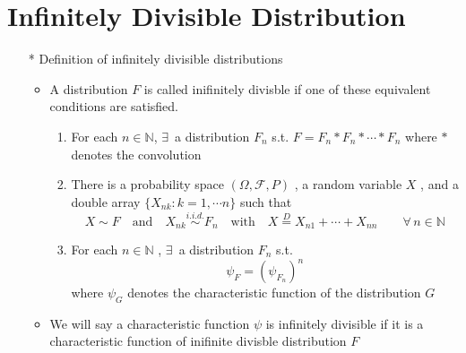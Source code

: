 \documentclass[12pt, A4]{article}
\newcommand{\N}{\mathbb{N}}
\newcommand{\F}{\mathcal{F}}
\newcommand{\exist}{\exists\,}
\newcommand{\foranyn}{\quad \forall \, n\in \N}
\begin{document}
\section{Infinitely Divisible Distribution}
\begin{itemize}
	\item[*] Definition of infinitely divisible distributions
	\begin{itemize}
		\item A distribution $F$ is called inifinitely divisble if one of these equivalent conditions are satisfied.
		\begin{enumerate}
			\item For each $n\in \N$, $\exist$ a distribution $F_n$ s.t. $F= F_n * F_n * \cdots * F_n$ where $*$ denotes the convolution
			\item There is a probability space $(\Omega, \F, P)$ , a random variable $X$ , and a double array $\{X_{nk} : k=1, \cdots n\}$ such that $$ X\sim F \quad \text{and} \quad X_{nk}\overset{i.i.d.}{\sim} F_n \quad \text{with} \quad X\overset{D}{=}X_{n1}+\cdots+X_{nn}\quad \foranyn$$
			\item For each $n\in \N$ , $\exist$ a distribution $F_n$ s.t. $$\psi_F = (\psi_{F_n})^n$$ where $\psi_G$ denotes the characteristic function of the distribution $G$
		\end{enumerate}
		
		\item We will say a characteristic function $\psi$ is infinitely divisible if it is a characteristic function of inifinite divisble distribution $F$
		

\end{itemize}
\end{itemize}
\end{document}
